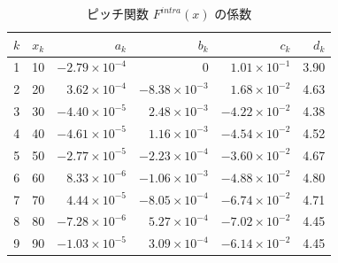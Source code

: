 \documentclass{jsai2e}
\begin{document}
\begin{table}[t]
\centering
\small
\setlength{\tabcolsep}{3pt}
\renewcommand{\arraystretch}{0.95}
\caption{ピッチ関数 $F^{intra}(x)$ の係数}
\label{table:pitch_coef}
\begin{tabular}{ccrrrr}
  
\hline
$k$ & $x_k$ & $a_k$ & $b_k$ & $c_k$ & $d_k$ \\
\hline
1 & 10 & $-2.79{\times}10^{-4}$ & 0 & $1.01{\times}10^{-1}$ & 3.90 \\
2 & 20 & $3.62{\times}10^{-4}$ & $-8.38{\times}10^{-3}$ & $1.68{\times}10^{-2}$ & 4.63 \\
3 & 30 & $-4.40{\times}10^{-5}$ & $2.48{\times}10^{-3}$ & $-4.22{\times}10^{-2}$ & 4.38 \\
4 & 40 & $-4.61{\times}10^{-5}$ & $1.16{\times}10^{-3}$ & $-4.54{\times}10^{-2}$ & 4.52 \\
5 & 50 & $-2.77{\times}10^{-5}$ & $-2.23{\times}10^{-4}$ & $-3.60{\times}10^{-2}$ & 4.67 \\
6 & 60 & $8.33{\times}10^{-6}$ & $-1.06{\times}10^{-3}$ & $-4.88{\times}10^{-2}$ & 4.80 \\
7 & 70 & $4.44{\times}10^{-5}$ & $-8.05{\times}10^{-4}$ & $-6.74{\times}10^{-2}$ & 4.71 \\
8 & 80 & $-7.28{\times}10^{-6}$ & $5.27{\times}10^{-4}$ & $-7.02{\times}10^{-2}$ & 4.45 \\
9 & 90 & $-1.03{\times}10^{-5}$ & $3.09{\times}10^{-4}$ & $-6.14{\times}10^{-2}$ & 4.45 \\
\hline
\end{tabular}
\end{table}
\end{document}
